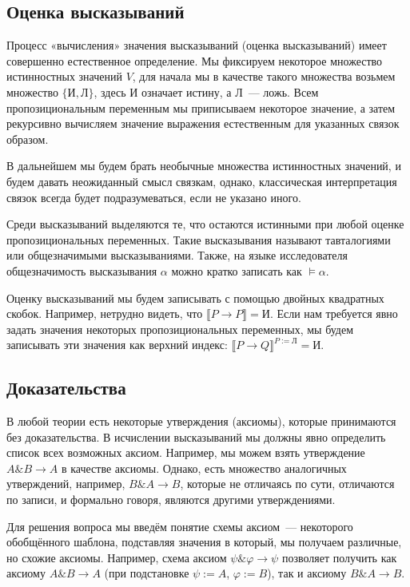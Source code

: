 \documentclass[a4paper,11pt]{article}
\theoremstyle{definition}
\newcommand{\sem}[2]{\llbracket #1 \rrbracket^{#2}}
\newcommand{\True}{\text{И}}
\newcommand{\False}{\text{Л}}
\newcommand{\amp}{\mathbin{\&}}
\begin{document}
\subsection{Оценка высказываний}
Процесс «вычисления» значения высказываний (оценка высказываний) имеет
совершенно естественное определение. Мы фиксируем некоторое множество
истинностных значений $V$, для начала мы в качестве такого множества возьмем
множество $\{\True, \False\}$, здесь $\True$ означает истину, а $\False$~---
ложь. Всем пропозициональным переменным мы приписываем некоторое значение, а
затем рекурсивно вычисляем значение выражения естественным для указанных связок
образом.

В дальнейшем мы будем брать необычные множества истинностных значений, и будем
давать неожиданный смысл связкам, однако, классическая интерпретация связок
всегда будет подразумеваться, если не указано иного.

Среди высказываний выделяются те, что остаются истинными при любой оценке
пропозициональных переменных. Такие высказывания называют тавталогиями или
общезначимыми высказываниями. Также, на языке исследователя общезначимость
высказывания $\alpha$ можно кратко записать как $\models \alpha$.

Оценку высказываний мы будем записывать с помощью двойных квадратных скобок.
Например, нетрудно видеть, что $\llbracket P \to P\rrbracket = \True$. Если нам
требуется явно задать значения некоторых пропозициональных переменных, мы будем
записывать эти значения как верхний индекс:
$\sem{P \to Q}{P:=\False} = \True$.

\subsection{Доказательства}
В любой теории есть некоторые утверждения (аксиомы), которые принимаются без
доказательства. В исчислении высказываний мы должны явно определить список всех
возможных аксиом. Например, мы можем взять утверждение $A \amp B \to A$ в
качестве аксиомы. Однако, есть множество аналогичных утверждений, например,
$B \amp A \to B$, которые не отличаясь по сути, отличаются по записи, и
формально говоря, являются другими утверждениями.

Для решения вопроса мы введём понятие схемы аксиом~--- некоторого обобщённого
шаблона, подставляя значения в который, мы получаем различные, но схожие
аксиомы. Например, схема аксиом $\psi \amp \varphi \to \psi$ позволяет получить
как аксиому $A \amp B \to A$ (при подстановке $\psi := A$, $\varphi := B$), так и
аксиому $B \amp A \to B$.
\end{document}
